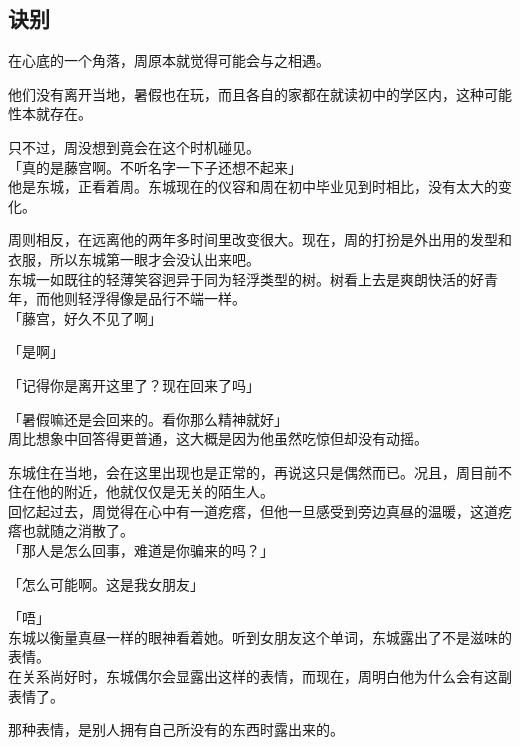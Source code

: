 \subsection{诀别}

在心底的一个角落，周原本就觉得可能会与之相遇。

他们没有离开当地，暑假也在玩，而且各自的家都在就读初中的学区内，这种可能性本就存在。

只不过，周没想到竟会在这个时机碰见。\\

「真的是藤宫啊。不听名字一下子还想不起来」\\

他是东城，正看着周。东城现在的仪容和周在初中毕业见到时相比，没有太大的变化。

周则相反，在远离他的两年多时间里改变很大。现在，周的打扮是外出用的发型和衣服，所以东城第一眼才会没认出来吧。\\

东城一如既往的轻薄笑容迥异于同为轻浮类型的树。树看上去是爽朗快活的好青年，而他则轻浮得像是品行不端一样。\\

「藤宫，好久不见了啊」

「是啊」

「记得你是离开这里了？现在回来了吗」

「暑假嘛还是会回来的。看你那么精神就好」\\

周比想象中回答得更普通，这大概是因为他虽然吃惊但却没有动摇。

东城住在当地，会在这里出现也是正常的，再说这只是偶然而已。况且，周目前不住在他的附近，他就仅仅是无关的陌生人。\\

回忆起过去，周觉得在心中有一道疙瘩，但他一旦感受到旁边真昼的温暖，这道疙瘩也就随之消散了。\\

「那人是怎么回事，难道是你骗来的吗？」

「怎么可能啊。这是我女朋友」

「唔」\\

东城以衡量真昼一样的眼神看着她。听到女朋友这个单词，东城露出了不是滋味的表情。\\

在关系尚好时，东城偶尔会显露出这样的表情，而现在，周明白他为什么会有这副表情了。

那种表情，是别人拥有自己所没有的东西时露出来的。\\

